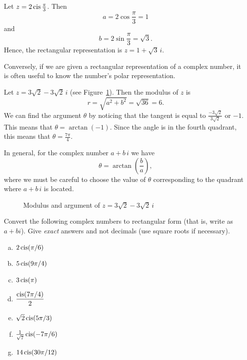 {\begin{example}\label{example:complex:1} Let $z=2\operatorname{cis} \frac{\pi}{3}$. Then
\[
a=2\cos \frac{\pi}{3}=1\]
 and \[
b=2\sin \frac{\pi}{3}=\sqrt{3}.\]
 Hence, the rectangular representation is $z=1+\sqrt{3}\, i$.
\end{example}
Conversely, if we are given a rectangular representation of a complex
number, it is often useful to know the number's polar representation.

\begin{example}\label{example:complex:2} Let $z=3\sqrt{2}-3\sqrt{2}\, i$ (see Figure~\ref{fig:complex:polar_to_cart}). Then the modulus of $z$ is 
\[
r=\sqrt{a^{2}+b^{2}}=\sqrt{36}=6.\]
 We can find the argument $\theta$ by noticing that the tangent is equal to $\frac{-3\sqrt{2}}{3\sqrt{2}}$ or $-1$. This means that
 $\theta = \arctan(-1)$.
 Since the angle is in the fourth quadrant, this means that $\theta = \frac{7\pi}{4}$. 
 
 In general, for the complex number $a + b\,i$ we have
 \[\theta=\arctan\left(\frac{b}{a}\right),\]
where we must be careful to choose the value of $\theta$ corresponding to the quadrant where $a + b\,i$ is located. 
 \end{example} 
\begin{figure}[htb]
	  \caption{\label{fig:complex:polar_to_cart} Modulus and argument of  $z=3\sqrt{2}-3\sqrt{2}\, i$}
\end{figure}

\begin{exercise}\label{exercise:complex:21}
Convert the following complex numbers to rectangular form (that is, write as $a + bi$). Give \emph{exact} answers and not decimals (use square roots if necessary).
\begin{multicols}{2}
\begin{enumerate}[(a)]

\item
$2 \operatorname{cis}(\pi / 6 )$
\item
$5 \operatorname{cis}(9\pi/4)$
\item
$3 \operatorname{cis}(\pi)$
 \item
$\dfrac{\operatorname{cis}(7\pi/4)}{2}$
\item
$\sqrt{2} \operatorname{cis}(5\pi / 3 )$
\item
$\frac{1}{\sqrt{7}} \operatorname{cis}(-7\pi / 6 )$
\item
$14 \operatorname{cis}(30 \pi / 12 )$


\end{enumerate}
\end{multicols}
\end{exercise}}
